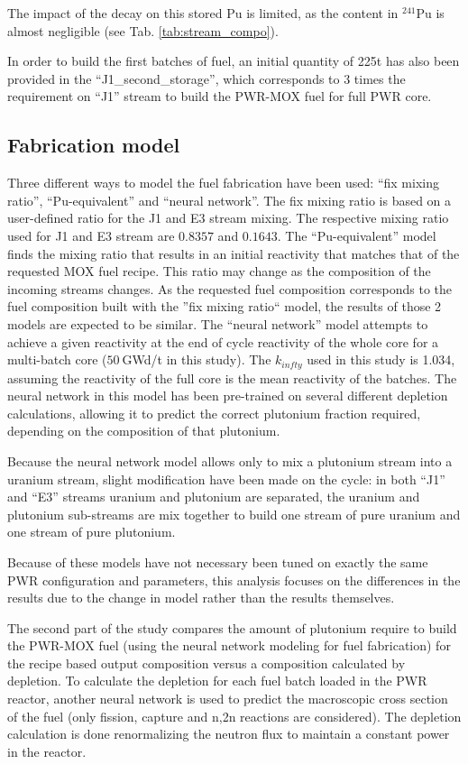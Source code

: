 \documentclass{anstrans}
\begin{document}
The impact of the decay on this stored Pu is limited, as the content in
$^{241}$Pu is almost negligible (see Tab. \ref{tab:stream_compo}).  
 
In order to build the first batches of fuel, an initial quantity of 225t has
also been provided in the ``J1\_second\_storage'', which corresponds to 3 times
the requirement on ``J1'' stream to build the PWR-MOX fuel for full PWR
core. 




\subsection{Fabrication model}
Three different ways to model the fuel fabrication have been used: ``fix mixing
ratio'', ``Pu-equivalent'' and ``neural network''.
The fix mixing ratio is based on a user-defined ratio for the J1 and E3 stream
mixing. The respective mixing ratio used for J1 and E3 stream are 
$0.8357$ and $0.1643$.
The ``Pu-equivalent'' model finds the mixing ratio that results in an initial
reactivity that matches that of the requested MOX fuel recipe.  This ratio may
change as the composition of the incoming streams changes.  As the requested
fuel composition corresponds to the fuel composition built with the ''fix mixing
ratio`` model, the results of those 2 models are expected to be similar.  The
``neural network'' model attempts to achieve a given reactivity at the  end of
cycle reactivity of the whole core for a multi-batch core ($50~$GWd/t in this
study). The $k_{infty}$ used in this study is 1.034, assuming the reactivity of
the full core is the mean reactivity of the batches. The neural network in this
model has been pre-trained on several different depletion calculations, allowing
it to predict the correct plutonium fraction required, depending on the
composition of that plutonium.

Because the neural network model allows only to mix a plutonium stream into a
uranium stream, slight modification have been made on the cycle: in both ``J1''
and ``E3'' streams uranium and plutonium are separated, the uranium and
plutonium sub-streams are mix together to build one stream of pure uranium and
one stream of pure plutonium. 

Because of these models have not necessary been tuned on exactly the same
PWR configuration and parameters, this analysis focuses on the differences
in the results due to the change in model rather than the results themselves.

The second part of the study compares the amount of plutonium require to build
the PWR-MOX fuel (using the neural network modeling for fuel fabrication) for
the recipe based output composition versus a composition calculated by depletion.
To calculate the depletion for each fuel batch loaded in the PWR reactor, another 
neural network is used to predict the macroscopic cross section of the
fuel \cite{Leniau2015125} (only fission, capture and n,2n reactions are considered). The
depletion calculation is done renormalizing the neutron flux to maintain a
constant power in the reactor.
\end{document}
